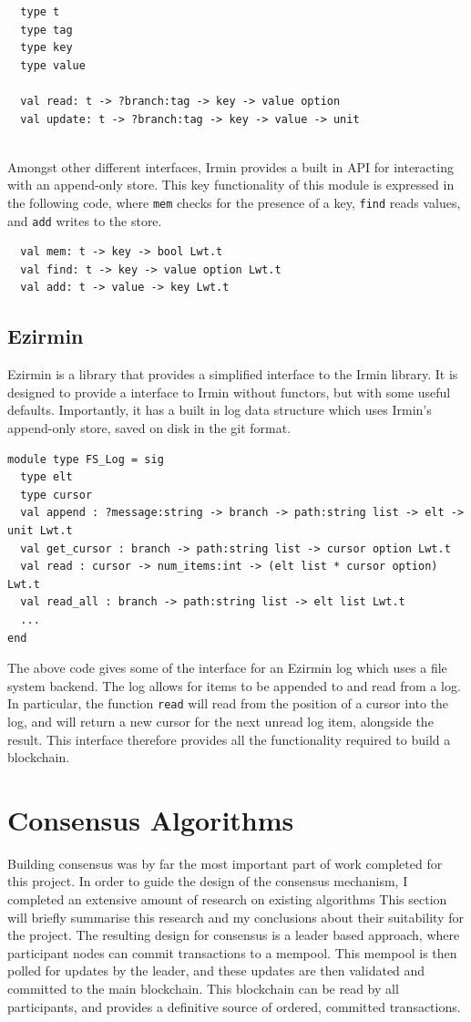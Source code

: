 \documentclass[12pt,a4paper,twoside,openright]{report}
\begin{document}
		\begin{lstlisting}
  type t
  type tag
  type key 
  type value

  val read: t -> ?branch:tag -> key -> value option
  val update: t -> ?branch:tag -> key -> value -> unit
			
		\end{lstlisting}
		Amongst other different interfaces, Irmin provides a built in API for interacting with an append-only store. This key functionality of this module is expressed in the following code, where \texttt{mem} checks for the presence of a key, \texttt{find} reads values, and \texttt{add} writes to the store.

		\begin{lstlisting}
  val mem: t -> key -> bool Lwt.t
  val find: t -> key -> value option Lwt.t
  val add: t -> value -> key Lwt.t
		\end{lstlisting}
	\subsection{Ezirmin}
	Ezirmin is a library that provides a simplified interface to the Irmin library. It is designed to provide a interface to Irmin without functors, but with some useful defaults. Importantly, it has a built in log data structure which uses Irmin's append-only store, saved on disk in the git format.\\
	\begin{lstlisting}
module type FS_Log = sig
  type elt 
  type cursor 
  val append : ?message:string -> branch -> path:string list -> elt -> unit Lwt.t
  val get_cursor : branch -> path:string list -> cursor option Lwt.t
  val read : cursor -> num_items:int -> (elt list * cursor option) Lwt.t
  val read_all : branch -> path:string list -> elt list Lwt.t
  ...
end
	\end{lstlisting}
	The above code gives some of the interface for an Ezirmin log which uses a file system backend.
	The log allows for items to be appended to and read from a log.
	In particular, the function \texttt{read} will read from the position of a cursor into the log, and will return a new cursor for the next unread log item, alongside the result.
	This interface therefore provides all the functionality required to build a blockchain.
	
	\section{Consensus Algorithms}
	Building consensus was by far the most important part of work completed for this project. 
	In order to guide the design of the consensus mechanism, I completed an extensive amount of research on existing algorithms
	This section will briefly summarise this research and my conclusions about their suitability for the project. 
	The resulting design for consensus is a leader based approach, where participant nodes can commit transactions to a mempool.
	This mempool is then polled for updates by the leader, and these updates are then validated and committed to the main blockchain.
	This blockchain can be read by all participants, and provides a definitive source of ordered, committed transactions.
\end{document}
